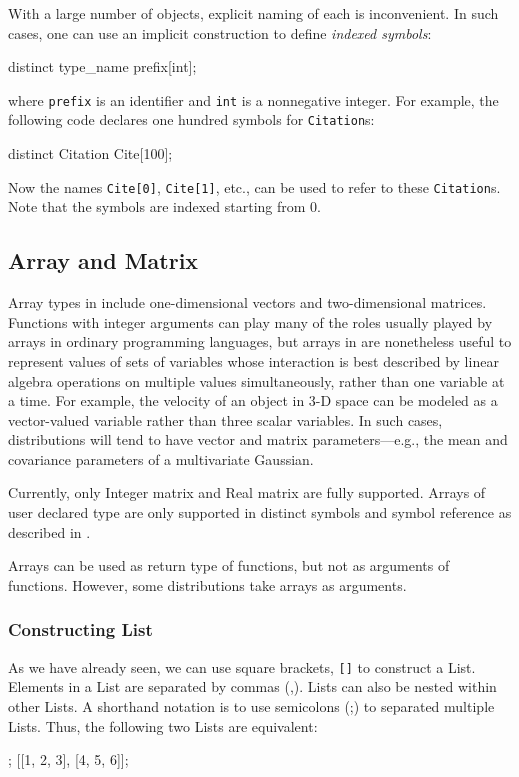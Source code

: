 \documentclass[12pt]{article}
\begin{document}
With a large number of objects, explicit naming of each is inconvenient.
In such cases, one can use an implicit construction to define {\em indexed symbols}:
\begin{blogcode}
distinct type_name prefix[int];
\end{blogcode}
where {\tt prefix} is an identifier and {\tt int} is a nonnegative integer.
For example, the following \bl code declares one hundred symbols for {\tt Citation}s:
\begin{blogcode}
distinct Citation Cite[100];
\end{blogcode}
Now the names \verb|Cite[0]|, \verb|Cite[1]|, etc., can be used to refer to these {\tt Citation}s. Note that the symbols are indexed starting from 0.

\subsection{Array and Matrix}\label{array-section}

Array types in \bl include one-dimensional vectors and two-dimensional
matrices. Functions with integer arguments can play many of the roles
usually played by arrays in ordinary programming languages, but arrays in
\bl are nonetheless useful to represent values of sets of variables
whose interaction is best described by linear algebra operations on
multiple values simultaneously, rather than one variable at a time.
For example, the velocity of an object in 3-D space can be modeled
as a vector-valued variable rather than three scalar variables.
In such cases, distributions will tend to have vector and matrix
parameters---e.g., the mean and covariance parameters of a
multivariate Gaussian.

Currently, only Integer matrix and Real matrix are fully
supported. Arrays of user declared type are only supported in distinct symbols and symbol reference as described in .

Arrays can be used as return type of functions, but not as arguments of functions. However, some distributions take arrays as arguments.

\subsubsection{Constructing List}\label{list-literal-section}
As we have already seen, we can use square brackets, \texttt{[]} to construct a List. Elements in a List are separated by commas (,). Lists can also be nested within other Lists. A shorthand notation is to use semicolons (;) to separated multiple Lists.
Thus, the following two Lists are equivalent:
\begin{blogcode}
[1, 2, 3; 4, 5, 6];
[[1, 2, 3], [4, 5, 6]];
\end{blogcode}
\end{document}
